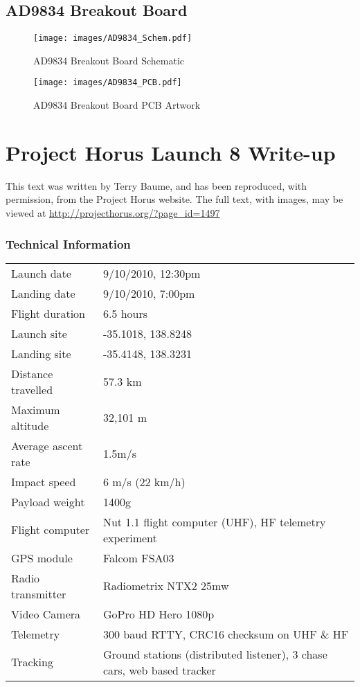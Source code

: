 \documentclass[a4paper,12pt]{article}
\begin{document}
\begin{appendices}
\subsection{AD9834 Breakout Board}
\label{ad9834_breakout}
\begin{figure}[h!]
\begin{center}
\texttt{[image: images/AD9834\_Schem.pdf]}
\caption{AD9834 Breakout Board Schematic}
\label{ad9834_schem}
\end{center}
\end{figure}
\begin{figure}[h!]
\begin{center}
\texttt{[image: images/AD9834\_PCB.pdf]}
\caption{AD9834 Breakout Board PCB Artwork}
\label{ad9834_PCB}
\end{center}
\end{figure}


\newpage
\section{Project Horus Launch 8 Write-up}
\label{horus8}
This text was written by Terry Baume, and has been reproduced, with permission, from the Project Horus website. The full text, with images, may be viewed at \url{http://projecthorus.org/?page_id=1497}

\subsubsection*{Technical Information}

\begin{tabular}{ll}
Launch date & 9/10/2010, 12:30pm\\
Landing date & 9/10/2010, 7:00pm\\
Flight duration	& 6.5 hours\\
Launch site & -35.1018, 138.8248\\
Landing site & -35.4148, 138.3231\\
Distance travelled & 57.3 km\\
Maximum altitude & 32,101 m\\
Average ascent rate & 1.5m/s\\
Impact speed & 6 m/s (22 km/h)\\
Payload weight & 1400g\\
Flight computer &	Nut 1.1 flight computer (UHF), HF telemetry experiment\\
GPS module & Falcom FSA03\\
Radio transmitter & Radiometrix NTX2 25mw\\
Video Camera & GoPro HD Hero 1080p\\
Telemetry & 300 baud RTTY, CRC16 checksum on UHF \& HF\\
Tracking & Ground stations (distributed listener), 3 chase cars, web based tracker\\
\end{tabular}


\end{appendices}
\end{document}
